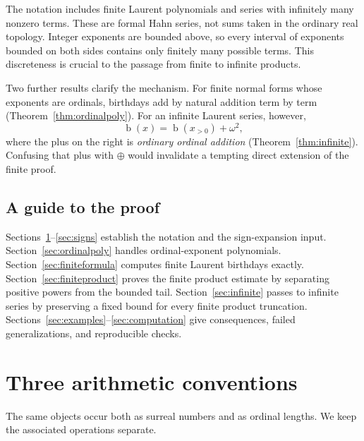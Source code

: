 \documentclass[11pt,letterpaper]{article}
\numberwithin{equation}{section}
\theoremstyle{definition}
\theoremstyle{remark}
\newcommand{\bd}{\operatorname{b}}
\begin{document}
The notation includes finite Laurent polynomials and series with infinitely
many nonzero terms. These are formal Hahn series, not sums taken in the
ordinary real topology. Integer exponents are bounded above, so every interval
of exponents bounded on both sides contains only finitely many possible terms.
This discreteness is crucial to the passage from finite to infinite products.

Two further results clarify the mechanism. For finite normal forms whose
exponents are ordinals, birthdays add by natural addition term by term
(Theorem~\ref{thm:ordinalpoly}). For an infinite Laurent series, however,
\begin{equation}\label{eq:infinite-preview}
 \bd(x)=\bd(x_{>0})+\omega^2,
\end{equation}
where the plus on the right is \emph{ordinary ordinal addition}
(Theorem~\ref{thm:infinite}). Confusing that plus with $\oplus$ would invalidate
a tempting direct extension of the finite proof.

\subsection{A guide to the proof}
Sections~\ref{sec:conventions}--\ref{sec:signs} establish the notation and the
sign-expansion input. Section~\ref{sec:ordinalpoly} handles ordinal-exponent
polynomials. Section~\ref{sec:finiteformula} computes finite Laurent birthdays
exactly. Section~\ref{sec:finiteproduct} proves the finite product estimate by
separating positive powers from the bounded tail. Section~\ref{sec:infinite}
passes to infinite series by preserving a fixed bound for every finite product
truncation. Sections~\ref{sec:examples}--\ref{sec:computation} give consequences,
failed generalizations, and reproducible checks.

\section{Three arithmetic conventions}
\label{sec:conventions}
The same objects occur both as surreal numbers and as ordinal lengths. We keep
the associated operations separate.
\end{document}
